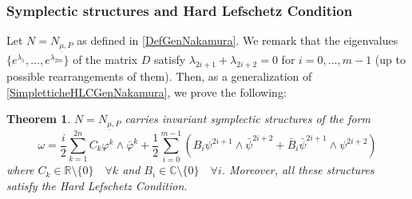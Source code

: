 \documentclass[a4paper, 11pt]{amsart}
\theoremstyle{plain}
\newtheorem{teorema}{Theorem} [section]
\theoremstyle{definition}
\newcommand{\C}{\mathbb{C}}
\numberwithin{equation}{section}
\begin{document}
\subsubsection{Symplectic structures and Hard Lefschetz Condition} Let $N = N_{\underline{\mu}, P}$ as defined in \eqref{DefGenNakamura}. We remark that the eigenvalues $\{e^{\lambda_{1}}, \ldots, e^{\lambda_{2m}}\}$ of the matrix $D$ satisfy $\lambda_{2i+1} + \lambda_{2i+2} = 0$ for $i = 0, \ldots, m-1$ (up to possible rearrangements of them). Then, as a generalization of \eqref{SimpletticheHLCGenNakamura}, we prove the following:

\begin{teorema}\label{SimpletticheHLCNuove}
    $N = N_{\underline{\mu}, P} $ carries invariant symplectic structures of the form
    \[  \omega = \dfrac{i}{2} \sum_{k = 1}^{2n}C_{k}\varphi^{k} \wedge \bar\varphi^{k} + \dfrac{1}{2}\sum_{i = 0}^{m-1}\left(B_{i}\psi^{2i+1} \wedge \bar\psi^{2i+2} + \bar B_{i}\bar\psi^{2i+1} \wedge \psi^{2i+2} \right)\]
    where $C_{k} \in \mathbb{R}\setminus \{0\} \quad \forall k$ and $B_{i} \in \C\setminus \{0\} \quad \forall i$. Moreover, all these structures satisfy the Hard Lefschetz Condition.
\end{teorema}
\end{document}
